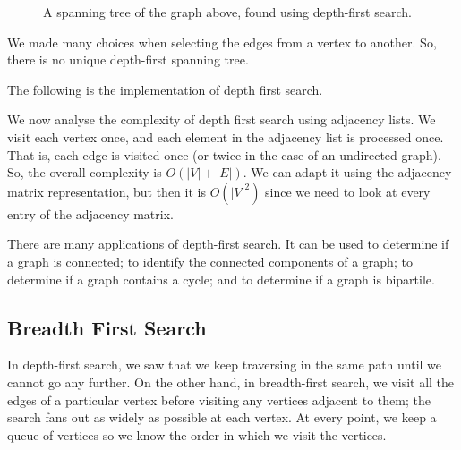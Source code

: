 \documentclass[a4paper, openany]{memoir}
\begin{document}
\begin{figure}[H]
    \centering
    \caption{A spanning tree of the graph above, found using depth-first search.}
\end{figure}
\noindent We made many choices when selecting the edges from a vertex to another. So, there is no unique depth-first spanning tree.

The following is the implementation of depth first search.


We now analyse the complexity of depth first search using adjacency lists. We visit each vertex once, and each element in the adjacency list is processed once. That is, each edge is visited once (or twice in the case of an undirected graph). So, the overall complexity is $O(|V| + |E|)$. We can adapt it using the adjacency matrix representation, but then it is $O(|V|^2)$ since we need to look at every entry of the adjacency matrix.

There are many applications of depth-first search. It can be used to determine if a graph is connected; to identify the connected components of a graph; to determine if a graph contains a cycle; and to determine if a graph is bipartile.

\subsection{Breadth First Search}
In depth-first search, we saw that we keep traversing in the same path until we cannot go any further. On the other hand, in breadth-first search, we visit all the edges of a particular vertex before visiting any vertices adjacent to them; the search fans out as widely as possible at each vertex. At every point, we keep a queue of vertices so we know the order in which we visit the vertices.
\end{document}

